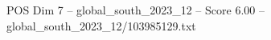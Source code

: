 \begin{textsample}{POS Dim 7 – global\_south\_2023\_12 – Score 6.00 – global\_south\_2023\_12/103985129.txt}
\end{textsample}
